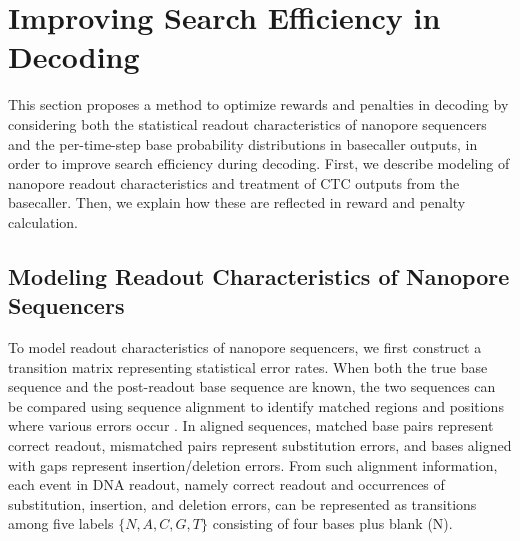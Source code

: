 \documentclass[sotsuron]{kuee}
\begin{document}
\section{Improving Search Efficiency in Decoding} \label{optimization}
This section proposes a method to optimize rewards and penalties in decoding by
considering both the statistical readout characteristics of nanopore
sequencers and the per-time-step base probability distributions in basecaller
outputs, in order to improve search efficiency during decoding.
First, we describe modeling of nanopore readout characteristics and treatment
of CTC outputs from the basecaller. Then, we explain how these are reflected in
reward and penalty calculation.

\subsection{Modeling Readout Characteristics of Nanopore Sequencers} \label{stat_model}
To model readout characteristics of nanopore sequencers, we first construct a
transition matrix representing statistical error rates.
When both the true base sequence and the post-readout base sequence are known,
the two sequences can be compared using sequence alignment to identify matched
regions and positions where various errors occur \cite{GOTOH1982705}.
In aligned sequences, matched base pairs represent correct readout, mismatched
pairs represent substitution errors, and bases aligned with gaps represent
insertion/deletion errors.
From such alignment information, each event in DNA readout, namely correct
readout and occurrences of substitution, insertion, and deletion errors, can be
represented as transitions among five labels $\{N,A,C,G,T\}$ consisting of
four bases plus blank (N).
\end{document}
